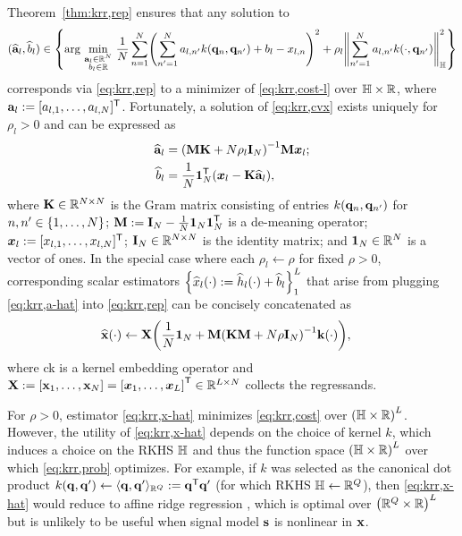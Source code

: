 Theorem~\ref{thm:krr,rep} ensures that any solution to 
\begin{align}
	(\est{\bma}_l,\est{b}_l) \in 
	\set{\argmin{\substack{\bma_l \in \reals{N} \\ b_l \in \real}} 
		\frac{1}{N} \sum_{n=1}^N \paren{\sum_{n'=1}^N a_{l,n'} k(\bmq_n,\bmq_{n'}) 
		+ b_l - x_{l,n}}^2 +
		\rho_l \norm{\sum_{n'=1}^N a_{l,n'} k(\cdot,\bmq_{n'})}^2_\hilb}
	\label{eq:krr,cvx}
\end{align}
corresponds via \eqref{eq:krr,rep} 
to a minimizer of \eqref{eq:krr,cost-l}
over $\mathbb{H} \times \mathbb{R}$,
where $\mathbf{a}_l := [a_{l,1},\dots,a_{l,N}]^{\mathsf{T}}$.
Fortunately, a solution of \eqref{eq:krr,cvx} exists uniquely
for $\rho_l > 0$
and can be expressed as
\begin{align}
	\est{\bma}_l &= \inv{\bmM \bmK + N\rho_l\eye{N}} \bmM \bmxg{l};
	\label{eq:krr,a-hat} \\
	\est{b}_l &= \frac{1}{N} \ones{N}\tpose \paren{\bmxg{l} - \bmK \est{\bma}_l},
	\label{eq:krr,b-hat}
\end{align}
where 
$\mathbf{K} \in \mathbb{R}^{N \times N}$ is the Gram matrix 
consisting of entries $k(\mathbf{q}_n,\mathbf{q}_{n'})$ for $n,n' \in \set{1,\dots,N}$;
$\mathbf{M} := \mathbf{I}_{N}-\frac{1}{N}\boldsymbol{1}_{N}\boldsymbol{1}_{N}^{\mathsf{T}}$ is a de-meaning operator;
$\boldsymbol{x}_{l} := [x_{l,1},\dots,x_{l,N}]^{\mathsf{T}}$;
$\mathbf{I}_{N} \in \mathbb{R}^{N \times N}$ is the identity matrix;
and $\boldsymbol{1}_{N} \in \mathbb{R}^{N}$ is a vector of ones.
In the special case where each
$\rho_l \gets \rho$ 
for fixed $\rho>0$, 
corresponding scalar estimators 
$\set{\est{x}_l\paren{\cdot} := \est{h}_l\paren{\cdot} + \est{b}_l}_1^L$
that arise from plugging \eqref{eq:krr,a-hat} into \eqref{eq:krr,rep}
can be concisely concatenated as
\begin{align}
	\bmxha{\cdot} &\gets \bmX 
		\paren{\frac{1}{N}\ones{N} + 
		\bmM\inv{\bmK\bmM + N\rho\eye{N}} \bmka{\cdot}},
		\label{eq:krr,x-hat}
\end{align}
where
ck
is a kernel embedding operator and 
$\bmX := \brac{\bmx_1,\dots,\bmx_N} = \brac{\bmxg{1},\dots,\bmxg{L}}\tpose 
\in \reals{L \times N}$
collects the regressands. 

For $\rho>0$, 
estimator \eqref{eq:krr,x-hat} minimizes \eqref{eq:krr,cost}
over $\paren{\hilb \times \real}^L$.
However, the utility of \eqref{eq:krr,x-hat}
depends on the choice of kernel $k$,
which induces a choice on the RKHS $\mathbb{H}$
and thus the function space $\paren{\hilb \times \real}^L$
over which \eqref{eq:krr,prob} optimizes.
For example, if $k$ was selected as the canonical dot product 
$k(\mathbf{q},\mathbf{q}') \gets \langle \mathbf{q},\mathbf{q}' \rangle_{\mathbb{R}^{Q}} := \mathbf{q}^{\mathsf{T}} \mathbf{q}'$
(for which RKHS $\mathbb{H} \gets \mathbb{R}^{Q}$),
then \eqref{eq:krr,x-hat} would reduce 
to affine ridge regression \cite{hoerl:70:rrb},
which is optimal over $\paren{\reals{Q} \times \real}^L$
but is unlikely to be useful when signal model $\mathbf{s}$ is nonlinear in $\mathbf{x}$.

